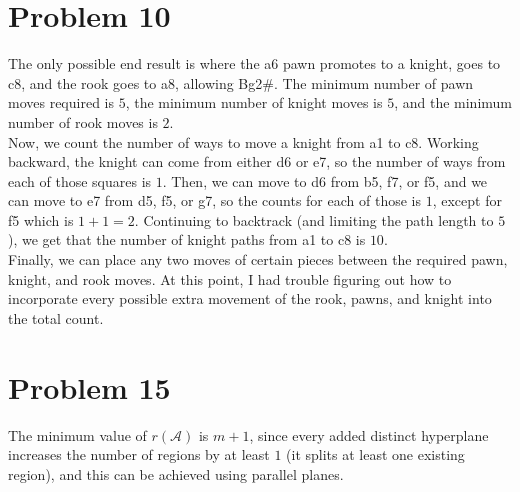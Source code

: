 \documentclass{article}
\begin{document}
\section*{Problem 10}
The only possible end result is where the a6 pawn promotes to a knight, goes to c8, and the rook goes to a8, allowing Bg2\#. The minimum number of pawn moves required is $5$, the minimum number of knight moves is $5$, and the minimum number of rook moves is $2$. \\

Now, we count the number of ways to move a knight from a1 to c8. Working backward, the knight can come from either d6 or e7, so the number of ways from each of those squares is $1$. Then, we can move to d6 from b5, f7, or f5, and we can move to e7 from d5, f5, or g7, so the counts for each of those is $1$, except for f5 which is $1 + 1 = 2$. Continuing to backtrack (and limiting the path length to $5$), we get that the number of knight paths from a1 to c8 is $10$. \\

Finally, we can place any two moves of certain pieces between the required pawn, knight, and rook moves. At this point, I had trouble figuring out how to incorporate every possible extra movement of the rook, pawns, and knight into the total count.

\section*{Problem 15}
The minimum value of $r(\mathcal{A})$ is $m + 1$, since every added distinct hyperplane increases the number of regions by at least $1$ (it splits at least one existing region), and this can be achieved using parallel planes.
\end{document}
